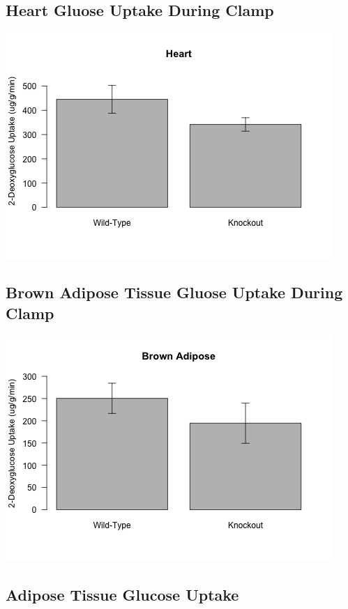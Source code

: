 \documentclass[]{article}
\begin{document}
\subsection{Heart Gluose Uptake During
Clamp}\label{heart-gluose-uptake-during-clamp}

\includegraphics{figures/heart-1.png}

\subsection{Brown Adipose Tissue Gluose Uptake During
Clamp}\label{brown-adipose-tissue-gluose-uptake-during-clamp}

\includegraphics{figures/bat-1.png}

\subsection{Adipose Tissue Glucose
Uptake}\label{adipose-tissue-glucose-uptake}
\end{document}
